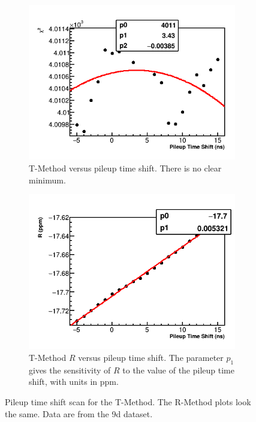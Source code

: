 \begin{figure}
\centering
    \begin{subfigure}[t]{0.45\textwidth}
        \centering
        \includegraphics[width=\textwidth]{TMethod_Chi2_Vs_PileupTimeShift_Canv}
        \caption{T-Method \chisq versus pileup time shift. There is no clear minimum.}
    \end{subfigure}%
    \hspace{1cm}
    \begin{subfigure}[t]{0.45\textwidth}
        \centering
        \includegraphics[width=\textwidth]{TMethod_R_Vs_PileupTimeShift_Canv}
        \caption{T-Method $R$ versus pileup time shift. The parameter $p_{1}$ gives the sensitivity of $R$ to the value of the pileup time shift, with units in ppm.}
    \end{subfigure}
\caption[Pileup time shift scan]{Pileup time shift scan for the T-Method. The R-Method plots look the same. Data are from the 9d dataset.}
\label{fig:PTSscan}
\end{figure}


